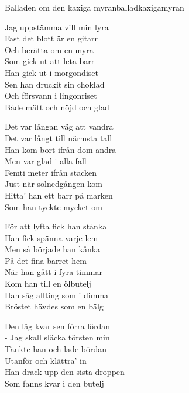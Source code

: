 \begin{song}{Balladen om den kaxiga myran}{balladkaxigamyran}
\begin{vers}
Jag uppstämma vill min lyra\\
Fast det blott är en gitarr\\
Och berätta om en myra\\
Som gick ut att leta barr\\
Han gick ut i morgondiset\\
Sen han druckit sin choklad\\
Och försvann i lingonriset\\
\repopen Både mätt och nöjd och glad \repclose\\
\end{vers}
\begin{vers}
Det var långan väg att vandra\\
Det var långt till närmsta tall\\
Han kom bort ifrån dom andra\\
Men var glad i alla fall\\
Femti meter ifrån stacken\\
Just när solnedgången kom\\
Hitta' han ett barr på marken\\
\repopen Som han tyckte mycket om \repclose\\
\end{vers}
\begin{vers}
För att lyfta fick han stånka\\
Han fick spänna varje lem\\
Men så började han kånka\\
På det fina barret hem\\
När han gått i fyra timmar\\
Kom han till en ölbutelj\\
Han såg allting som i dimma\\
\repopen Bröstet hävdes som en bälg \repclose\\
\end{vers}
\begin{vers}
Den låg kvar sen förra lördan\\
- Jag skall släcka törsten min\\
Tänkte han och lade bördan\\
Utanför och klättra' in\\
Han drack upp den sista droppen\\
Som fanns kvar i den butelj\\

\end{vers}
\end{song}
